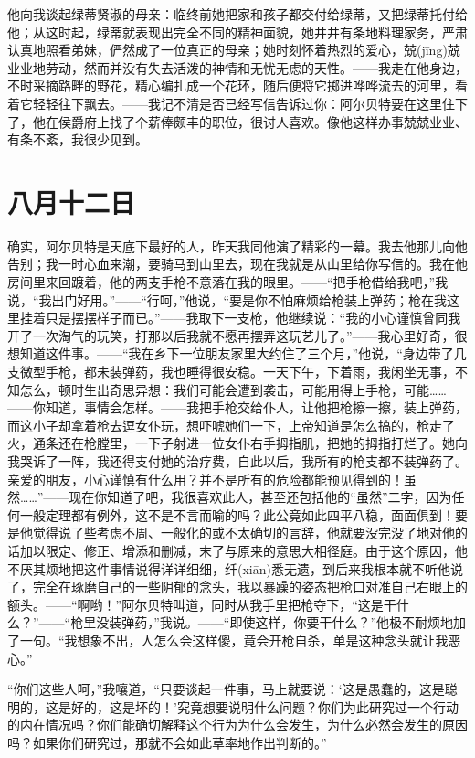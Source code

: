 \documentclass[12pt,oneside]{book}
\begin{document}
他向我谈起绿蒂贤淑的母亲：临终前她把家和孩子都交付给绿蒂，又把绿蒂托付给他；从这时起，绿蒂就表现出完全不同的精神面貌，她井井有条地料理家务，严肃认真地照看弟妹，俨然成了一位真正的母亲；她时刻怀着热烈的爱心，兢(jīng)兢业业地劳动，然而并没有失去活泼的神情和无忧无虑的天性。——我走在他身边，不时采摘路畔的野花，精心编扎成一个花环，随后便将它掷进哗哗流去的河里，看着它轻轻往下飘去。——我记不清是否已经写信告诉过你：阿尔贝特要在这里住下了，他在侯爵府上找了个薪俸颇丰的职位，很讨人喜欢。像他这样办事兢兢业业、有条不紊，我很少见到。
　
　
\chapter{八月十二日}
确实，阿尔贝特是天底下最好的人，昨天我同他演了精彩的一幕。我去他那儿向他告别；我一时心血来潮，要骑马到山里去，现在我就是从山里给你写信的。我在他房间里来回踱着，他的两支手枪不意落在我的眼里。——“把手枪借给我吧，”我说，“我出门好用。”——“行呵，”他说，“要是你不怕麻烦给枪装上弹药；枪在我这里挂着只是摆摆样子而已。”——我取下一支枪，他继续说：“我的小心谨慎曾同我开了一次淘气的玩笑，打那以后我就不愿再摆弄这玩艺儿了。”——我心里好奇，很想知道这件事。——“我在乡下一位朋友家里大约住了三个月，”他说，“身边带了几支微型手枪，都未装弹药，我也睡得很安稳。一天下午，下着雨，我闲坐无事，不知怎么，顿时生出奇思异想：我们可能会遭到袭击，可能用得上手枪，可能……——你知道，事情会怎样。——我把手枪交给仆人，让他把枪擦一擦，装上弹药，而这小子却拿着枪去逗女仆玩，想吓唬她们一下，上帝知道是怎么搞的，枪走了火，通条还在枪膛里，一下子射进一位女仆右手拇指肌，把她的拇指打烂了。她向我哭诉了一阵，我还得支付她的治疗费，自此以后，我所有的枪支都不装弹药了。亲爱的朋友，小心谨慎有什么用？并不是所有的危险都能预见得到的！虽然……”——现在你知道了吧，我很喜欢此人，甚至还包括他的“虽然”二字，因为任何一般定理都有例外，这不是不言而喻的吗？此公竟如此四平八稳，面面俱到！要是他觉得说了些考虑不周、一般化的或不太确切的言辞，他就要没完没了地对他的话加以限定、修正、增添和删减，末了与原来的意思大相径庭。由于这个原因，他不厌其烦地把这件事情说得详详细细，纤(xiān)悉无遗，到后来我根本就不听他说了，完全在琢磨自己的一些阴郁的念头，我以暴躁的姿态把枪口对准自己右眼上的额头。——“啊哟！”阿尔贝特叫道，同时从我手里把枪夺下，“这是干什么？”——“枪里没装弹药，”我说。——“即使这样，你要干什么？”他极不耐烦地加了一句。“我想象不出，人怎么会这样傻，竟会开枪自杀，单是这种念头就让我恶心。”

“你们这些人呵，”我嚷道，“只要谈起一件事，马上就要说：‘这是愚蠢的，这是聪明的，这是好的，这是坏的！’究竟想要说明什么问题？你们为此研究过一个行动的内在情况吗？你们能确切解释这个行为为什么会发生，为什么必然会发生的原因吗？如果你们研究过，那就不会如此草率地作出判断的。”
\end{document}
